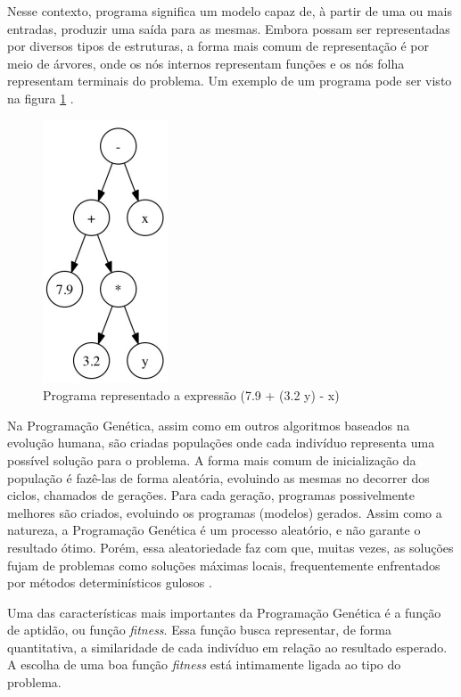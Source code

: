 \documentclass[12pt]{article}
\begin{document}
Nesse contexto, programa significa um modelo capaz de, à partir de uma ou mais entradas, produzir uma saída para as mesmas. Embora possam ser representadas por diversos tipos de estruturas, a forma mais comum de representação é por meio de árvores, onde os nós internos representam funções e os nós folha representam terminais do problema. Um exemplo de um programa pode ser visto na figura \ref{treeProgram} \cite{Sannino2015}.

\begin{figure}[!htb]
	\centering
	\includegraphics{programTree2}
	\caption{Programa representado a expressão (7.9 + (3.2 \* y) - x)}
	\label{treeProgram}
\end{figure}

Na Programação Genética, assim como em outros algoritmos baseados na evolução humana, são criadas populações onde cada indivíduo representa uma possível solução para o problema. A forma mais comum de inicialização da população é fazê-las de forma aleatória, evoluindo as mesmas no decorrer dos ciclos, chamados de gerações. Para cada geração, programas possivelmente melhores são criados, evoluindo os programas (modelos) gerados. Assim como a natureza, a Programação Genética é um processo aleatório, e não garante o resultado ótimo. Porém, essa aleatoriedade faz com que, muitas vezes, as soluções fujam de problemas como soluções máximas locais, frequentemente enfrentados por métodos determinísticos gulosos \cite{mcphee2008field}.

Uma das características mais importantes da Programação Genética é a função de aptidão, ou função \emph{fitness}. Essa função busca representar, de forma quantitativa, a similaridade de cada indivíduo em relação ao resultado esperado. A escolha de uma boa função \emph{fitness} está intimamente ligada ao tipo do problema.
\end{document}
